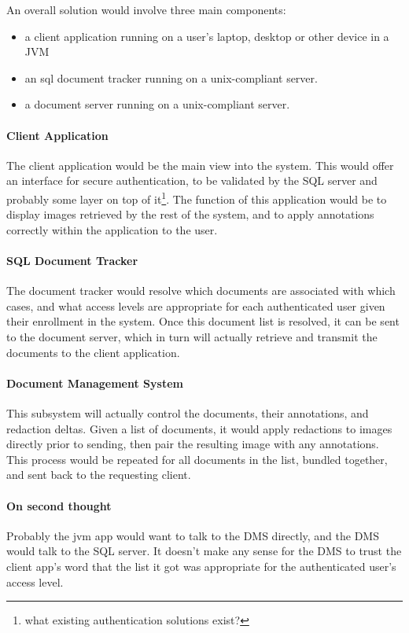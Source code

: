 An overall solution would involve three main components:
\begin{itemize}
	\item a client application running on a user's laptop, desktop or other
		device in a JVM
	\item an sql document tracker running on a unix-compliant server.
	\item a document server running on a unix-compliant server.
\end{itemize}

\paragraph{Client Application}The client application would be the main view
into the system.  This would offer an interface for secure authentication, to
be validated by the SQL server and probably some layer on top of
it\footnote{what existing authentication solutions exist?}.  The function of
this application would be to display images retrieved by the rest of the
system, and to apply annotations correctly within the application to the user.

\paragraph{SQL Document Tracker}The document tracker would resolve which
documents are associated with which cases, and what access levels are
appropriate for each authenticated user given their enrollment in the system.
Once this document list is resolved, it can be sent to the document server,
which in turn will actually retrieve and transmit the documents to the client
application.

\paragraph{Document Management System}This subsystem will actually control the
documents, their annotations, and redaction deltas.  Given a list of documents,
it would apply redactions to images directly prior to sending, then pair the
resulting image with any annotations.  This process would be repeated for all
documents in the list, bundled together, and sent back to the requesting
client.

\paragraph{On second thought}Probably the jvm app would want to talk to the DMS
directly, and the DMS would talk to the SQL server.  It doesn't make any sense
for the DMS to trust the client app's word that the list it got was appropriate
for the authenticated user's access level.

